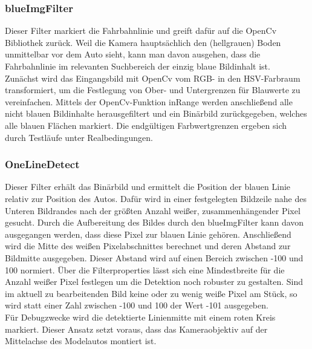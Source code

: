 \documentclass[12pt,a4paper]{report}
\begin{document}
\subsubsection{blueImgFilter}
Dieser Filter markiert die Fahrbahnlinie und greift dafür auf die OpenCv Bibliothek zurück. Weil die Kamera hauptsächlich den (hellgrauen) Boden unmittelbar vor dem Auto sieht, kann man davon ausgehen, dass die Fahrbahnlinie im relevanten Suchbereich der einzig blaue Bildinhalt ist.\\
Zunächst wird das Eingangsbild mit OpenCv vom RGB- in den HSV-Farbraum transformiert, um die Festlegung von Ober- und Untergrenzen für Blauwerte zu vereinfachen. Mittels der OpenCv-Funktion inRange werden anschließend alle nicht blauen Bildinhalte herausgefiltert und ein Binärbild zurückgegeben, welches alle blauen Flächen markiert. Die endgültigen Farbwertgrenzen ergeben sich durch Testläufe unter Realbedingungen.\\

\subsubsection{OneLineDetect}
Dieser Filter erhält das Binärbild und ermittelt die Position der blauen Linie relativ zur Position des Autos. Dafür wird in einer festgelegten Bildzeile nahe des Unteren Bildrandes nach der größten Anzahl weißer, zusammenhängender Pixel gesucht. Durch die Aufbereitung des Bildes durch den blueImgFilter kann davon ausgegangen werden, dass diese Pixel zur blauen Linie gehören. Anschließend wird die Mitte des weißen Pixelabschnittes berechnet und deren Abstand zur Bildmitte ausgegeben. Dieser Abstand wird auf einen Bereich zwischen -100 und 100 normiert. Über die Filterproperties lässt sich eine Mindestbreite für die Anzahl weißer Pixel festlegen um die Detektion noch robuster zu gestalten. Sind im aktuell zu bearbeitenden Bild keine oder zu wenig weiße Pixel am Stück, so wird statt einer Zahl zwischen -100 und 100 der Wert -101 ausgegeben.\\
Für Debugzwecke wird die detektierte Linienmitte mit einem roten Kreis markiert. 
Dieser Ansatz setzt voraus, dass das Kameraobjektiv auf der Mittelachse des Modelautos montiert ist.
 
\end{document}
